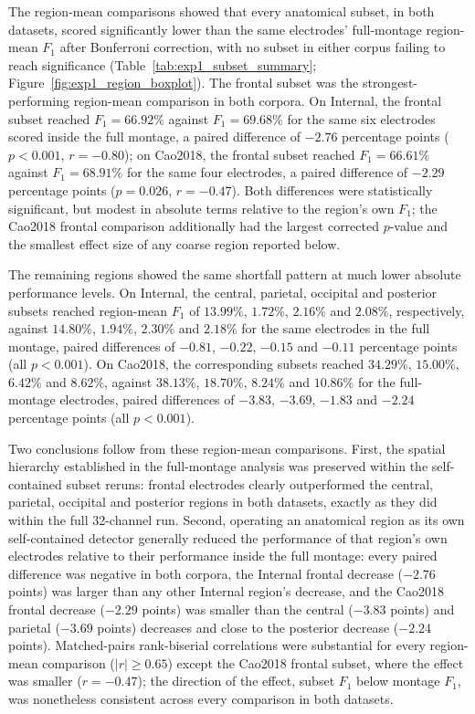 The region-mean comparisons showed that every anatomical subset, in both datasets, scored significantly lower than the same electrodes' full-montage region-mean $F_1$ after Bonferroni correction, with no subset in either corpus failing to reach significance (Table~\ref{tab:exp1_subset_summary}; Figure~\ref{fig:exp1_region_boxplot}). The frontal subset was the strongest-performing region-mean comparison in both corpora. On Internal, the frontal subset reached $F_1=66.92\%$ against $F_1=69.68\%$ for the same six electrodes scored inside the full montage, a paired difference of $-2.76$ percentage points ($p<0.001$, $r=-0.80$); on Cao2018, the frontal subset reached $F_1=66.61\%$ against $F_1=68.91\%$ for the same four electrodes, a paired difference of $-2.29$ percentage points ($p=0.026$, $r=-0.47$). Both differences were statistically significant, but modest in absolute terms relative to the region's own $F_1$; the Cao2018 frontal comparison additionally had the largest corrected $p$-value and the smallest effect size of any coarse region reported below.

The remaining regions showed the same shortfall pattern at much lower absolute performance levels. On Internal, the central, parietal, occipital and posterior subsets reached region-mean $F_1$ of $13.99\%$, $1.72\%$, $2.16\%$ and $2.08\%$, respectively, against $14.80\%$, $1.94\%$, $2.30\%$ and $2.18\%$ for the same electrodes in the full montage, paired differences of $-0.81$, $-0.22$, $-0.15$ and $-0.11$ percentage points (all $p<0.001$). On Cao2018, the corresponding subsets reached $34.29\%$, $15.00\%$, $6.42\%$ and $8.62\%$, against $38.13\%$, $18.70\%$, $8.24\%$ and $10.86\%$ for the full-montage electrodes, paired differences of $-3.83$, $-3.69$, $-1.83$ and $-2.24$ percentage points (all $p<0.001$).

Two conclusions follow from these region-mean comparisons. First, the spatial hierarchy established in the full-montage analysis was preserved within the self-contained subset reruns: frontal electrodes clearly outperformed the central, parietal, occipital and posterior regions in both datasets, exactly as they did within the full 32-channel run. Second, operating an anatomical region as its own self-contained detector generally reduced the performance of that region's own electrodes relative to their performance inside the full montage: every paired difference was negative in both corpora, the Internal frontal decrease ($-2.76$ points) was larger than any other Internal region's decrease, and the Cao2018 frontal decrease ($-2.29$ points) was smaller than the central ($-3.83$ points) and parietal ($-3.69$ points) decreases and close to the posterior decrease ($-2.24$ points). Matched-pairs rank-biserial correlations were substantial for every region-mean comparison ($|r|\geq0.65$) except the Cao2018 frontal subset, where the effect was smaller ($r=-0.47$); the direction of the effect, subset $F_1$ below montage $F_1$, was nonetheless consistent across every comparison in both datasets.
